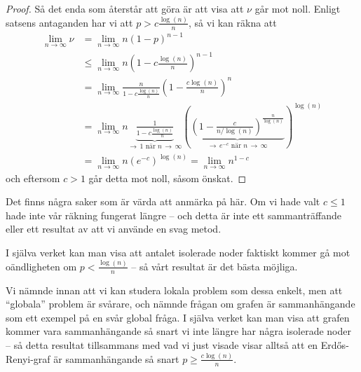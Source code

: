 \documentclass[nobib]{tufte-handout}
\begin{document}
\begin{proposition}
\begin{proof}
        Så det enda som återstår att göra är att visa att $\nu$ går mot noll. Enligt satsens antaganden har vi att $p > c\frac{\log(n)}{n}$, så vi kan räkna att
        \begin{align*}
            \lim_{n\to\infty} \nu &= \lim_{n\to\infty} n(1-p)^{n-1}\\
            &\leq \lim_{n\to\infty} n\left(1 - c\frac{\log(n)}{n}\right)^{n-1}\\
            &= \lim_{n\to\infty} \frac{n}{1 - c\frac{\log(n)}{n}}\left(1 - \frac{c\log(n)}{n}\right)^{n}\\
            &= \lim_{n\to\infty} n\underbrace{\frac{1}{1 - c\frac{\log(n)}{n}}}_{\to\, 1\text{ när }n\,\to\,\infty}\left(\underbrace{\left(1 - \frac{c}{n/\log(n)}\right)^{\frac{n}{\log(n)}}}_{\to\, e^{-c}\text{ när }n\,\to\, \infty}\right)^{\log(n)}\\
            &= \lim_{n \to \infty} n \left(e^{-c}\right)^{\log(n)} = \lim_{n \to \infty} n^{1-c}
        \end{align*}
        och eftersom $c > 1$ går detta mot noll, såsom önskat.
    \end{proof}
\end{proposition}

Det finns några saker som är värda att anmärka på här. Om vi hade valt $c \leq 1$ hade inte vår räkning fungerat längre -- och detta är inte ett sammanträffande eller ett resultat av att vi använde en svag metod.

I själva verket kan man visa att antalet isolerade noder faktiskt kommer gå mot oändligheten om $p < \frac{\log(n)}{n}$ -- så vårt resultat är det bästa möjliga.

Vi nämnde innan att vi kan studera lokala problem som dessa enkelt, men att ``globala'' problem är svårare, och nämnde frågan om grafen är sammanhängande som ett exempel på en svår global fråga. I själva verket kan man visa att grafen kommer vara sammanhängande så snart vi inte längre har några isolerade noder -- så detta resultat tillsammans med vad vi just visade visar alltså att en Erd\H{o}s-Renyi-graf är sammanhängande så snart $p \geq \frac{c\log(n)}{n}$.
\end{document}
